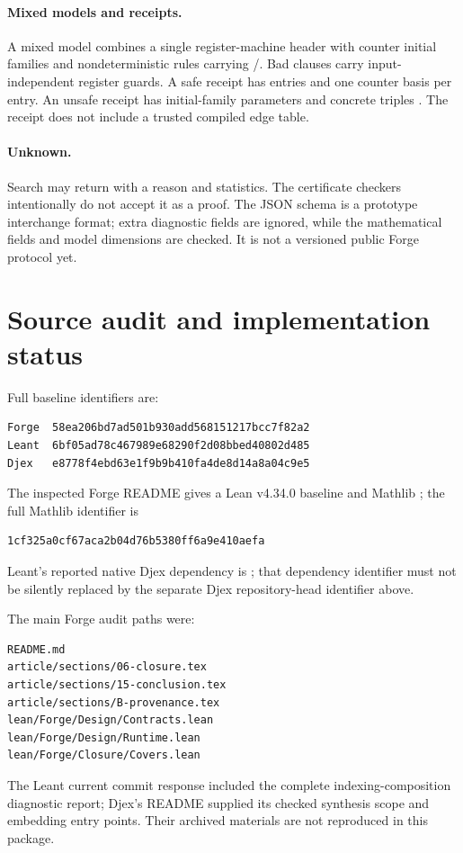 \paragraph{Mixed models and receipts.}
A mixed model combines a single register-machine header with counter initial
families and nondeterministic rules carrying /.
Bad clauses carry input-independent register guards. A safe receipt has
 entries  and one counter basis per
entry. An unsafe receipt has initial-family parameters and concrete
 triples . The receipt does not include
a trusted compiled edge table.

\paragraph{Unknown.}
Search may return  with a reason and statistics.
The certificate checkers intentionally do not accept it as a proof. The JSON
schema is a prototype interchange format; extra diagnostic fields are ignored,
while the mathematical fields and model dimensions are checked. It is not a
versioned public Forge protocol yet.

\section{Source audit and implementation status}
\label{app:status}
Full baseline identifiers are:
\begin{lstlisting}
Forge  58ea206bd7ad501b930add568151217bcc7f82a2
Leant  6bf05ad78c467989e68290f2d08bbed40802d485
Djex   e8778f4ebd63e1f9b9b410fa4de8d14a8a04c9e5
\end{lstlisting}
The inspected Forge README gives a Lean v4.34.0 baseline and Mathlib
; the full Mathlib identifier is
\begin{lstlisting}
1cf325a0cf67aca2b04d76b5380ff6a9e410aefa
\end{lstlisting} Leant's reported native
Djex dependency is ; that dependency identifier must not be
silently replaced by the separate Djex repository-head identifier above.

The main Forge audit paths were:
\begin{lstlisting}
README.md
article/sections/06-closure.tex
article/sections/15-conclusion.tex
article/sections/B-provenance.tex
lean/Forge/Design/Contracts.lean
lean/Forge/Design/Runtime.lean
lean/Forge/Closure/Covers.lean
\end{lstlisting}
The Leant current commit response included
the complete indexing-composition diagnostic report; Djex's README supplied its
checked synthesis scope and embedding entry points. Their archived materials
are not reproduced in this package.


